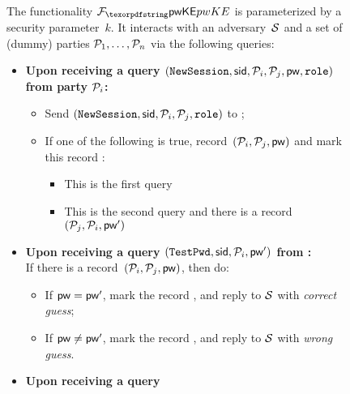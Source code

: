 \begin{figure}[htbp]
  \centering
  \begin{fboxenv}
    \begin{minipage}{0.95\textwidth}
      The functionality $\FpwKE$ is parameterized by a security parameter~$k$.
      It interacts with an adversary~$\mathcal{S}$ and a set of (dummy) parties $\mathcal{P}_1,\ldots,\mathcal{P}_n$ via the following queries:
      \begin{itemize}
      \item
        \textbf{Upon receiving a query
        $(\texttt{NewSession},\mathsf{sid},\mathcal{P}_i,\mathcal{P}_j,\mathsf{pw},\texttt{role})$ from party $\mathcal{P}_i$:}
        \begin{itemize}
          \item Send $(\texttt{NewSession},\mathsf{sid},\mathcal{P}_i,\mathcal{P}_j,\texttt{role})$ to \Sim;
          \item If one of the following is true, record~$(\mathcal{P}_i,\mathcal{P}_j,\mathsf{pw})$ and mark this record :
          \begin{itemize}
             \item This is the first \NewSession query %
             \item This is the second \NewSession query %
             and there is a record~$(\mathcal{P}_j,\mathcal{P}_i,\mathsf{pw}')$
          \end{itemize}
        \end{itemize}
      \item
        \textbf{Upon receiving a query
        $(\texttt{TestPwd},\mathsf{sid},\mathcal{P}_i,\mathsf{pw}')$ from \Sim{}:} \\
        If there is a  record~$(\mathcal{P}_i,\mathcal{P}_j,\mathsf{pw})$, then do: 
        \begin{itemize}
          \item If $\mathsf{pw}=\mathsf{pw}'$, mark the record , and reply to $\mathcal{S}$ with \emph{correct guess};
          \item If $\mathsf{pw}\neq\mathsf{pw}'$, mark the record , and reply to $\mathcal{S}$ with \emph{wrong guess}.
        \end{itemize}
      \item
        \textbf{Upon receiving a query
}
\end{itemize}
\end{minipage}
\end{fboxenv}
\end{figure}
